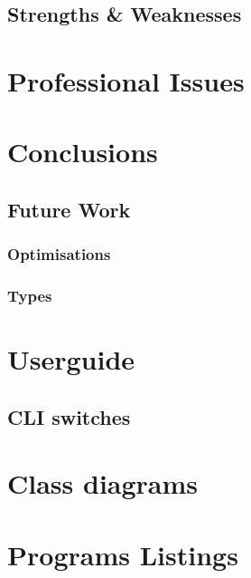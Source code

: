 \documentclass[11pt]{report}
\begin{document}
\section{Strengths \& Weaknesses}

\chapter{Professional Issues}

\chapter{Conclusions}
\section{Future Work}
\subsection{Optimisations}
\subsection{Types}

\begin{appendices}

\chapter{Userguide}
\section{CLI switches}

\chapter{Class diagrams}

\chapter{Programs Listings}

\end{appendices}
\end{document}

